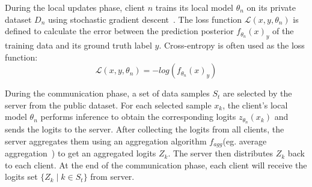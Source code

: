 During the local updates phase, client $n$ trains its local model $\theta_{n}$ on its private dataset $D_{n}$ using stochastic gradient descent~\cite{lecun1998gradient}. 
The loss function $\mathcal{L}(x, y, \theta_{n})$ is defined to calculate the error between the prediction posterior $f_{\theta_{n}}(x)_y$ of the training data and its ground truth label $y$. 
Cross-entropy is often used as the loss function:
\begin{equation}
\mathcal{L}(x, y, \theta_{n}) = -log(f_{\theta_{n}}(x)_y)
\label{eq:loss_function}
\end{equation}
\iffalse
The training of local model utilizes stochastic gradient descent~\cite{lecun1998gradient} to minimize the loss function:
\begin{equation}
\theta_{n}\leftarrow \theta_{n} - \eta_n \sum_{(x,y) \in B} \nabla_{\theta_{n}} \mathcal{L}(x, y, \theta_{n})
\label{eq:stochastic_gradient_descent}
\end{equation}
where $B$ is a batch of training data from $D_{n}$, $\eta_n$ is the learning rate for updating the local model.
\fi

During the communication phase, a set of data samples $S_t$ are selected by the server from the public dataset. 
For each selected sample $x_k$, the client’s local model $\theta_{n}$ performs inference to obtain the corresponding logits $z_{\theta_{n}}(x_k)$ and sends the logits to the server. 
After collecting the logits from all clients, the server aggregates them using an aggregation algorithm $f_{agg}$(eg. average aggregation~\cite{li2019fedmd}) to get an aggregated logits $Z_k$. 
The server then distributes $Z_k$ back to each client.
At the end of the communication phase, each client will receive the logits set $\{ Z_k \mid k \in S_t \}$ from server.

